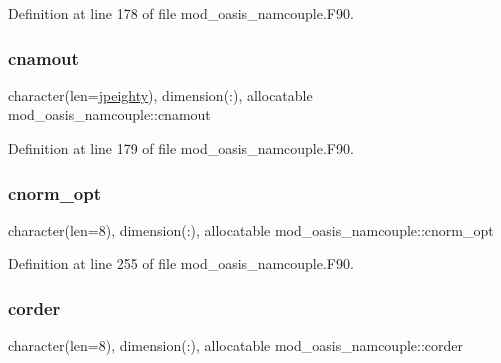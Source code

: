 Definition at line 178 of file mod\+\_\+oasis\+\_\+namcouple.\+F90.

\mbox{\label{namespacemod__oasis__namcouple_a71ba84b9a7a813ca2551bcde99a0b5b5}} 
\subsubsection{\texorpdfstring{cnamout}{cnamout}}
{\footnotesize\ttfamily character(len=\hyperlink{namespacemod__oasis__namcouple_a4fb10ad6e864dcbe34c4a8b02204a523}{jpeighty}), dimension(\+:), allocatable mod\+\_\+oasis\+\_\+namcouple\+::cnamout\hspace{0.3cm}{\ttfamily [private]}}



Definition at line 179 of file mod\+\_\+oasis\+\_\+namcouple.\+F90.

\mbox{\label{namespacemod__oasis__namcouple_a205e8ba5863c6bf6de5c8450fb060c7a}} 
\subsubsection{\texorpdfstring{cnorm\+\_\+opt}{cnorm\_opt}}
{\footnotesize\ttfamily character(len=8), dimension(\+:), allocatable mod\+\_\+oasis\+\_\+namcouple\+::cnorm\+\_\+opt\hspace{0.3cm}{\ttfamily [private]}}



Definition at line 255 of file mod\+\_\+oasis\+\_\+namcouple.\+F90.

\mbox{\label{namespacemod__oasis__namcouple_a070f65b97986d1075f1deed9224cd89b}} 
\subsubsection{\texorpdfstring{corder}{corder}}
{\footnotesize\ttfamily character(len=8), dimension(\+:), allocatable mod\+\_\+oasis\+\_\+namcouple\+::corder\hspace{0.3cm}{\ttfamily [private]}}



